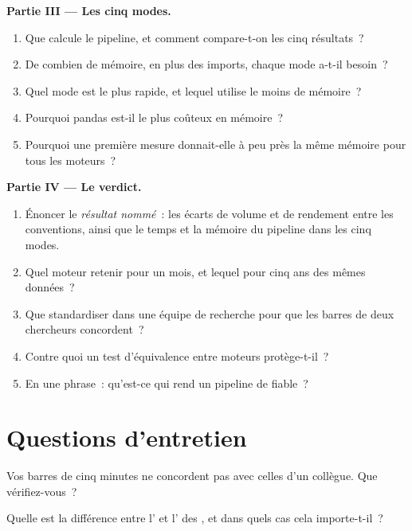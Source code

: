 \begin{problem}
\medskip\noindent\textbf{Partie III --- Les cinq modes.}
\begin{enumerate}[resume]
\item Que calcule le pipeline, et comment compare-t-on les cinq résultats~?
\item De combien de mémoire, en plus des imports, chaque mode a-t-il besoin~?
\item Quel mode est le plus rapide, et lequel utilise le moins de mémoire~?
\item Pourquoi pandas est-il le plus coûteux en mémoire~?
\item Pourquoi une première mesure donnait-elle à peu près la même mémoire pour tous les moteurs~?
\end{enumerate}

\medskip\noindent\textbf{Partie IV --- Le verdict.}
\begin{enumerate}[resume]
\item Énoncer le \emph{résultat nommé}~: les écarts de volume et de rendement entre les conventions, ainsi que le temps et la mémoire du pipeline dans
les cinq modes.
\item Quel moteur retenir pour un mois, et lequel pour cinq ans des mêmes données~?
\item Que standardiser dans une équipe de recherche pour que les barres de deux chercheurs concordent~?
\item Contre quoi un test d'équivalence entre moteurs protège-t-il~?
\item En une phrase~: qu'est-ce qui rend un pipeline de  fiable~?
\end{enumerate}
\end{problem}

\section{Questions d'entretien}

\begin{interviewq}\label{iq:pl:dataframes:1}
Vos barres de cinq minutes ne concordent pas avec celles d'un collègue. Que vérifiez-vous~?
\end{interviewq}

\begin{interviewq}\label{iq:pl:dataframes:2}
Quelle est la différence entre l' et l' des , et dans quels cas cela importe-t-il~?
\end{interviewq}

